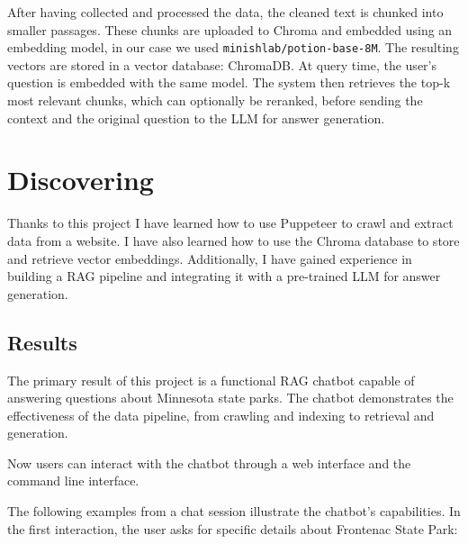 \documentclass[11pt]{article}
\begin{document}
After having collected and processed the data, the cleaned text is chunked into smaller passages. These chunks are uploaded to Chroma and embedded using an embedding model, in our case we used \texttt{minishlab/potion-base-8M}. The resulting vectors are stored in a vector database: ChromaDB. At query time, the user's question is embedded with the same model. The system then retrieves the top-k most relevant chunks, which can optionally be reranked, before sending the context and the original question to the LLM for answer generation.

\section{Discovering}
Thanks to this project I have learned how to use Puppeteer to crawl and extract data from a website. I have also learned how to use the Chroma database to store and retrieve vector embeddings. Additionally, I have gained experience in building a RAG pipeline and integrating it with a pre-trained LLM for answer generation.

\subsection{Results}
The primary result of this project is a functional RAG chatbot capable of answering questions about Minnesota state parks. The chatbot demonstrates the effectiveness of the data pipeline, from crawling and indexing to retrieval and generation.

Now users can interact with the chatbot through a web interface and the command line interface.

The following examples from a chat session illustrate the chatbot's capabilities. In the first interaction, the user asks for specific details about Frontenac State Park:
\end{document}
